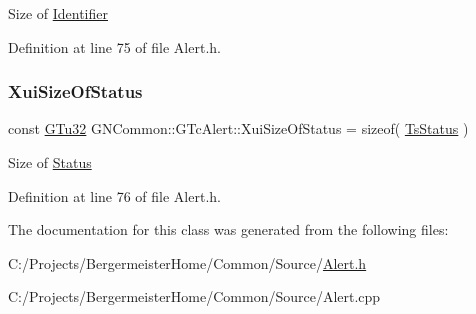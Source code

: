 Size of \mbox{\hyperlink{struct_identifier}{Identifier}} 

Definition at line 75 of file Alert.\+h.

\mbox{\label{class_g_n_common_1_1_g_tc_alert_a8d30391ac04c117ef5e25b9a0fa693e5}} 
\subsubsection{\texorpdfstring{Xui\+Size\+Of\+Status}{XuiSizeOfStatus}}
{\footnotesize\ttfamily const \mbox{\hyperlink{namespace_g_n_common_ae5485474bc8f23e462e920a17b377b53}{G\+Tu32}} G\+N\+Common\+::\+G\+Tc\+Alert\+::\+Xui\+Size\+Of\+Status = sizeof( \mbox{\hyperlink{struct_g_n_common_1_1_g_tc_alert_1_1_ts_status}{Ts\+Status}} )\hspace{0.3cm}{\ttfamily [static]}}

Size of \mbox{\hyperlink{struct_status}{Status}} 

Definition at line 76 of file Alert.\+h.



The documentation for this class was generated from the following files\+:\begin{DoxyCompactItemize}
\item 
C\+:/\+Projects/\+Bergermeister\+Home/\+Common/\+Source/\mbox{\hyperlink{_alert_8h}{Alert.\+h}}\item 
C\+:/\+Projects/\+Bergermeister\+Home/\+Common/\+Source/Alert.\+cpp\end{DoxyCompactItemize}
